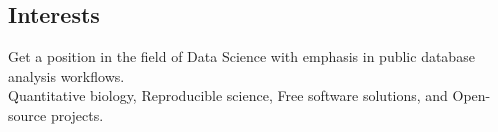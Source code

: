 \documentclass[margin,line]{res}
\begin{document}
\address{Calle Tambo Huascar 201, San Miguel, Lima - Peru}
\address{avallecam@gmail.com, @avallecam, (+51)950951722}

\begin{resume}

\vspace*{.15in}

\section{\sc Interests}%

Get a position in the field of Data Science with emphasis in public database analysis workflows.\\
Quantitative biology, Reproducible science, Free software solutions, and Open-source projects.%





\end{resume}
\end{document}
